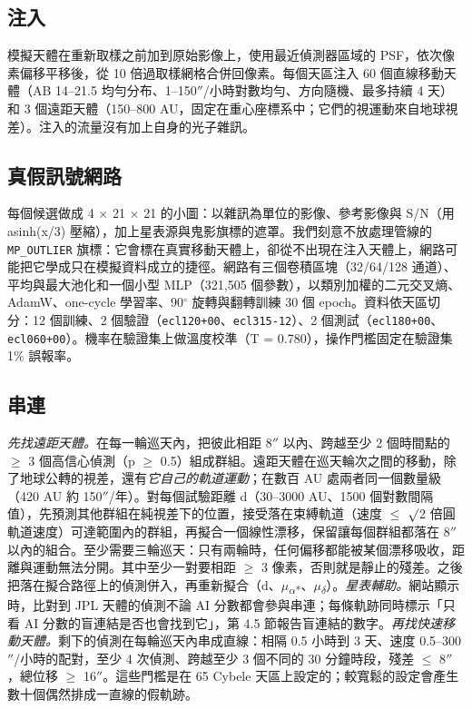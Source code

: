 \documentclass[twocolumn]{aastex631}
\begin{document}
\subsection{注入}
模擬天體在重新取樣之前加到原始影像上，使用最近偵測器區域的 PSF，依次像素偏移平移後，從 10 倍過取樣網格合併回像素。每個天區注入 60 個直線移動天體（AB 14--21.5 均勻分布、1--150$''$/小時對數均勻、方向隨機、最多持續 4 天）和 3 個遠距天體（150--800 AU，固定在重心座標系中；它們的視運動來自地球視差）。注入的流量沒有加上自身的光子雜訊。

\subsection{真假訊號網路}
每個候選做成 4 $\times$ 21 $\times$ 21 的小圖：以雜訊為單位的影像、參考影像與 S/N（用 asinh(x/3) 壓縮），加上星表源與鬼影旗標的遮罩。我們刻意不放處理管線的 \texttt{MP\_OUTLIER} 旗標：它會標在真實移動天體上，卻從不出現在注入天體上，網路可能把它學成只在模擬資料成立的捷徑。網路有三個卷積區塊（32/64/128 通道）、平均與最大池化和一個小型 MLP（321,505 個參數），以類別加權的二元交叉熵、AdamW、one-cycle 學習率、90$^\circ$ 旋轉與翻轉訓練 30 個 epoch。資料依天區切分：12 個訓練、2 個驗證（\texttt{ecl120+00}、\texttt{ecl315-12}）、2 個測試（\texttt{ecl180+00}、\texttt{ecl060+00}）。機率在驗證集上做溫度校準（T = 0.780），操作門檻固定在驗證集 1\% 誤報率。

\subsection{串連}
\emph{先找遠距天體。}在每一輪巡天內，把彼此相距 8$''$ 以內、跨越至少 2 個時間點的 $\ge$ 3 個高信心偵測（p $\ge$ 0.5）組成群組。遠距天體在巡天輪次之間的移動，除了地球公轉的視差，還有\emph{它自己的軌道運動}；在數百 AU 處兩者同一個數量級（420 AU 約 150$''$/年）。對每個試驗距離 d（30--3000 AU、1500 個對數間隔值），先預測其他群組在純視差下的位置，接受落在束縛軌道（速度 $\le$ $\surd$2 倍圓軌道速度）可達範圍內的群組，再擬合一個線性漂移，保留讓每個群組都落在 8$''$ 以內的組合。至少需要三輪巡天：只有兩輪時，任何偏移都能被某個漂移吸收，距離與運動無法分開。其中至少一對要相距 $\ge$ 3 像素，否則就是靜止的殘差。之後把落在擬合路徑上的偵測併入，再重新擬合（d、$\mu$\textsubscript{$\alpha$*}、$\mu$\textsubscript{$\delta$}）。\emph{星表輔助。}網站顯示時，比對到 JPL 天體的偵測不論 AI 分數都會參與串連；每條軌跡同時標示「只看 AI 分數的盲連結是否也會找到它」，第 4.5 節報告盲連結的數字。\emph{再找快速移動天體。}剩下的偵測在每輪巡天內串成直線：相隔 0.5 小時到 3 天、速度 0.5--300$''$/小時的配對，至少 4 次偵測、跨越至少 3 個不同的 30 分鐘時段，殘差 $\le$ 8$''$，總位移 $\ge$ 16$''$。這些門檻是在 65 Cybele 天區上設定的；較寬鬆的設定會產生數十個偶然排成一直線的假軌跡。
\end{document}
